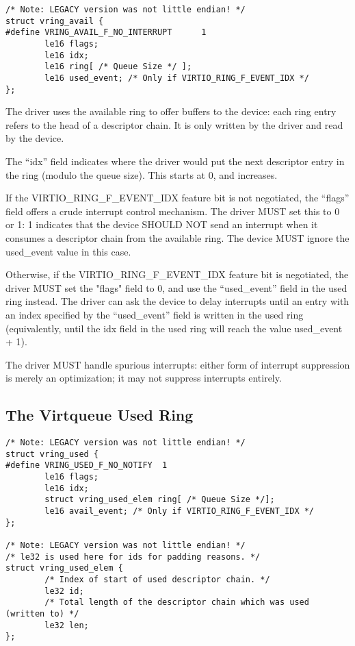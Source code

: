 \begin{lstlisting}
/* Note: LEGACY version was not little endian! */
struct vring_avail {
#define VRING_AVAIL_F_NO_INTERRUPT      1
        le16 flags;
        le16 idx;
        le16 ring[ /* Queue Size */ ];
        le16 used_event; /* Only if VIRTIO_RING_F_EVENT_IDX */
};
\end{lstlisting}

The driver uses the available ring to offer buffers to the
device: each ring entry refers to the head of a descriptor chain.  It is only
written by the driver and read by the device.

The “idx” field indicates where the driver would put the next descriptor
entry in the ring (modulo the queue size). This starts at 0, and increases.

If the VIRTIO_RING_F_EVENT_IDX feature bit is not negotiated, the
“flags” field offers a crude interrupt control mechanism.  The driver
MUST set this to 0 or 1: 1 indicates that the device SHOULD NOT send
an interrupt when it consumes a descriptor chain from the available
ring.  The device MUST ignore the used_event value in this case.

Otherwise, if the VIRTIO_RING_F_EVENT_IDX feature bit is negotiated,
the driver MUST set the "flags" field to 0, and use the “used_event”
field in the used ring instead.  The driver can ask the device to delay interrupts
until an entry with an index specified by the “used_event” field is
written in the used ring (equivalently, until the idx field in the
used ring will reach the value used_event + 1).

The driver MUST handle spurious interrupts: either form of interrupt
suppression is merely an optimization; it may not suppress interrupts
entirely.

\subsection{The Virtqueue Used Ring}\label{sec:Basic Facilities of a Virtio Device / Virtqueues / The Virtqueue Used Ring}

\begin{lstlisting}
/* Note: LEGACY version was not little endian! */
struct vring_used {
#define VRING_USED_F_NO_NOTIFY  1
        le16 flags;
        le16 idx;
        struct vring_used_elem ring[ /* Queue Size */];
        le16 avail_event; /* Only if VIRTIO_RING_F_EVENT_IDX */
};

/* Note: LEGACY version was not little endian! */
/* le32 is used here for ids for padding reasons. */
struct vring_used_elem {
        /* Index of start of used descriptor chain. */
        le32 id;
        /* Total length of the descriptor chain which was used (written to) */
        le32 len;
};
\end{lstlisting}


